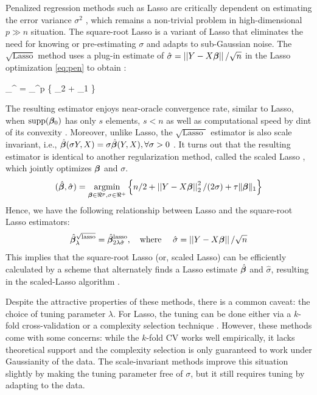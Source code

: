 \documentclass[chapters]{uamaththesis}
\def\sql{$\sqrt{\text{Lasso }}$}
\begin{document}
Penalized regression methods such as Lasso are critically dependent on estimating the error variance $\sigma^2$ , which remains a non-trivial problem in high-dimensional $p \gg n$ situation. The square-root Lasso \citep{belloni2011square} is a variant of Lasso that eliminates the need for knowing or pre-estimating $\sigma$ and adapts to sub-Gaussian noise. The $\sqrt{\text{Lasso}}$ method uses a plug-in estimate of $\hat \sigma = \left|\left|Y-X\boldsymbol{\beta}\right|\right|/\sqrt{n}$ in the Lasso optimization \eqref{eq:pen} to obtain : 

\beq
\hat{\bbeta}_{\lambda}^{} = \argmin_{\bbeta \in \Re^p} \{  _2 + \tau \norm{\bbeta}_1 \} \label{eq:sqlasso}
\eeq

The resulting estimator enjoys near-oracle convergence rate, similar to Lasso, when $\text{supp}(\boldsymbol{\beta}_0)$ has only $s$ elements, $s < n$ as well as computational speed by dint of its convexity \citep{belloni2011square}. Moreover, unlike Lasso, the \sql{} estimator is also scale invariant, i.e., $\hat{\boldsymbol{\beta}}(\sigma Y, X) = \sigma \hat{\boldsymbol{\beta}}(Y, X), \forall \sigma > 0$ \citep{giraud2014introduction}. It turns out that the resulting estimator is identical to another regularization method, called the scaled Lasso \citep{sun2012scaled}, which jointly optimizes $\boldsymbol{\beta}$ and $\sigma$. 
\[
(\hat{\bbeta},\hat{\sigma}) = \argmin_{\bbeta \in \Re^p, \sigma \in \Re^+} \left\{ n/2 + \vectornorm{Y-X\bbeta}_2^2 / (2\sigma) + \tau \norm{\bbeta}_1 \right\}
\]
Hence, we have the following relationship between Lasso and the square-root Lasso estimators:
\[
\hat{\boldsymbol{\beta}}_{\lambda}^{\sqrt{\text{lasso}}} = \hat{\boldsymbol{\beta}}_{2\lambda \hat{\sigma}}^{\text{lasso}}, \quad \text{where } \quad \hat{\sigma} = \left|\left|Y-X\boldsymbol{\beta}\right|\right|/\sqrt{n}
\]
This implies that the square-root Lasso (or, scaled Lasso) can be efficiently calculated by a scheme that alternately finds a Lasso estimate $\hat{\boldsymbol{\beta}}$ and $\hat{\sigma}$, resulting in the scaled-Lasso algorithm \citep{sun2012scaled}.  

Despite the attractive properties of these methods, there is a common caveat: the choice of tuning parameter $\lambda$. For Lasso, the tuning can be done either via a $k$-fold cross-validation or a complexity selection technique \citep{giraud2012high}. However, these methods come with some concerns: while the $k$-fold CV works well empirically, it lacks theoretical support and the complexity selection is only guaranteed to work under Gaussianity of the data. The scale-invariant methods improve this situation slightly by making the tuning parameter free of $\sigma$, but it still requires tuning by adapting to the data. 
%
\end{document}
